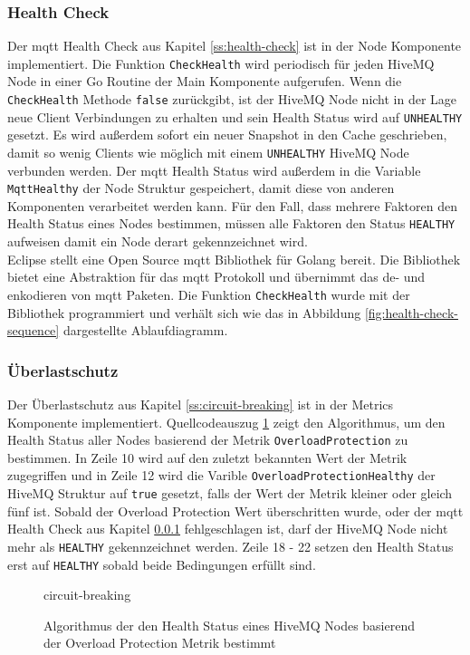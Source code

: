 \subsubsection{Health Check} \label{si:health-check}
Der \ac{mqtt} Health Check aus Kapitel \ref{ss:health-check} ist in der Node Komponente implementiert. Die Funktion \verb|CheckHealth| wird periodisch für jeden HiveMQ Node in einer Go Routine der Main Komponente aufgerufen. Wenn die \verb|CheckHealth| Methode \verb|false| zurückgibt, ist der HiveMQ Node nicht in der Lage neue Client Verbindungen zu erhalten und sein Health Status wird auf \verb|UNHEALTHY| gesetzt. Es wird au{\ss}erdem sofort ein neuer Snapshot in den Cache geschrieben, damit so wenig Clients wie möglich mit einem \verb|UNHEALTHY| HiveMQ Node verbunden werden. Der \ac{mqtt} Health Status wird au{\ss}erdem in die Variable \verb|MqttHealthy| der Node Struktur gespeichert, damit diese von anderen Komponenten verarbeitet werden kann. Für den Fall, dass mehrere Faktoren den Health Status eines Nodes bestimmen, müssen alle Faktoren den Status \verb|HEALTHY| aufweisen damit ein Node derart gekennzeichnet wird.
\\
Eclipse stellt eine Open Source \ac{mqtt} Bibliothek für Golang bereit.
\cite{EclipsePahoMqtt2021}
Die Bibliothek bietet eine Abstraktion für das \ac{mqtt} Protokoll und übernimmt das de- und enkodieren von \ac{mqtt} Paketen. Die Funktion \verb|CheckHealth| wurde mit der Bibliothek programmiert und verhält sich wie das in Abbildung \ref{fig:health-check-sequence} dargestellte Ablaufdiagramm.

\subsubsection{Überlastschutz}
Der Überlastschutz aus Kapitel \ref{ss:circuit-breaking} ist in der Metrics Komponente implementiert. Quellcodeauszug \ref{code:circuit-breaking} zeigt den Algorithmus, um den Health Status aller Nodes basierend der Metrik \verb|OverloadProtection| zu bestimmen. In Zeile 10 wird auf den zuletzt bekannten Wert der Metrik zugegriffen und in Zeile 12 wird die Varible \verb|OverloadProtectionHealthy| der HiveMQ Struktur auf \verb|true| gesetzt, falls der Wert der Metrik kleiner oder gleich fünf ist.
Sobald der Overload Protection Wert überschritten wurde, oder der \ac{mqtt} Health Check aus Kapitel \ref{si:health-check} fehlgeschlagen ist, darf der HiveMQ Node nicht mehr als \verb|HEALTHY| gekennzeichnet werden. Zeile 18 - 22 setzen den Health Status erst auf \verb|HEALTHY| sobald beide Bedingungen erfüllt sind.
\begin{figure}
    {circuit-breaking}
    \caption{Algorithmus der den Health Status eines HiveMQ Nodes basierend der Overload Protection Metrik bestimmt}
    \label{code:circuit-breaking}
\end{figure}
\newpage

